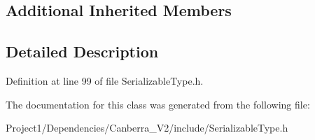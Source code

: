 \subsection*{Additional Inherited Members}


\subsection{Detailed Description}


Definition at line 99 of file Serializable\+Type.\+h.



The documentation for this class was generated from the following file\+:\begin{DoxyCompactItemize}
\item 
Project1/\+Dependencies/\+Canberra\+\_\+\+V2/include/Serializable\+Type.\+h\end{DoxyCompactItemize}
